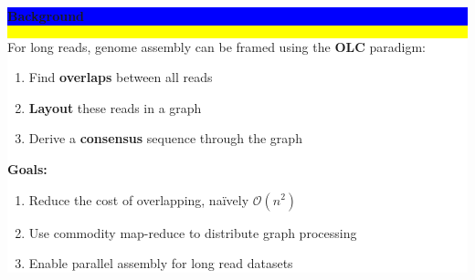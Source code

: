 \documentclass[11pt]{a0poster}
\begin{document}
\noindent\colorbox{Yellow}{
\begin{minipage}[t][2045pt][t]{\linewidth}

\noindent\begin{minipage}{0.025\linewidth}
\hfill
\pagebreak
\end{minipage}
\begin{minipage}{0.3\linewidth}
\vspace{75pt}
\colorbox{Blue}{
\begin{minipage}{\linewidth}
\vspace{25pt}
\begin{center}
\Huge \bf \color{White} Background
\end{center}
\vspace{10pt}
\end{minipage}
}
\colorbox{White}{
\begin{minipage}[t][600pt][t]{\linewidth}
\color{Blue}
\vspace{20pt}
\LARGE For long reads, genome assembly can be framed using the \textbf{OLC} paradigm:
\begin{enumerate}
\item Find \textbf{overlaps} between all reads
\item \textbf{Layout} these reads in a graph
\item Derive a \textbf{consensus} sequence through the graph
\end{enumerate}
\vspace{20pt}
\textbf{Goals:}
\begin{enumerate}
\item Reduce the cost of overlapping, na\"{i}vely $\mathcal{O}(n^2)$
\item Use commodity map-reduce to distribute graph processing
\item Enable parallel assembly for long read datasets
\end{enumerate}
\hfill
\pagebreak
\end{minipage}
}


\end{minipage}
\end{minipage}}
\end{document}
